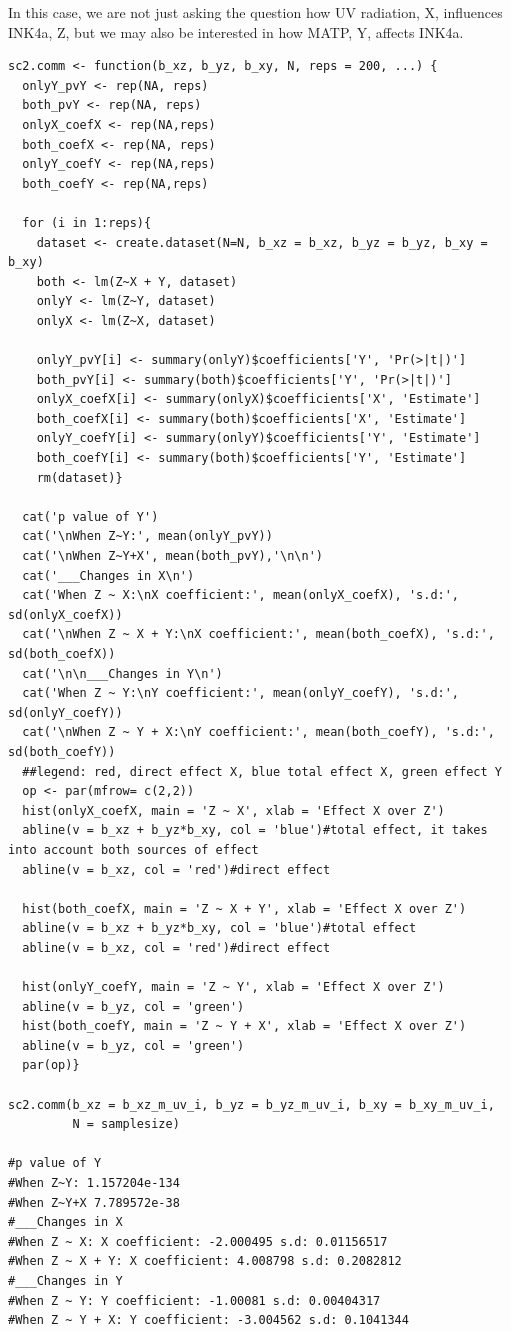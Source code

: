 \documentclass{article}
\begin{document}
In this case, we are not just asking the question how UV radiation, X, influences INK4a, Z, but we may also be interested in how MATP, Y, affects INK4a.
\begin{lstlisting}
sc2.comm <- function(b_xz, b_yz, b_xy, N, reps = 200, ...) {
  onlyY_pvY <- rep(NA, reps)
  both_pvY <- rep(NA, reps)
  onlyX_coefX <- rep(NA,reps)
  both_coefX <- rep(NA, reps)
  onlyY_coefY <- rep(NA,reps)
  both_coefY <- rep(NA,reps)
  
  for (i in 1:reps){
    dataset <- create.dataset(N=N, b_xz = b_xz, b_yz = b_yz, b_xy = b_xy)
    both <- lm(Z~X + Y, dataset)
    onlyY <- lm(Z~Y, dataset)
    onlyX <- lm(Z~X, dataset)
    
    onlyY_pvY[i] <- summary(onlyY)$coefficients['Y', 'Pr(>|t|)']
    both_pvY[i] <- summary(both)$coefficients['Y', 'Pr(>|t|)']
    onlyX_coefX[i] <- summary(onlyX)$coefficients['X', 'Estimate']
    both_coefX[i] <- summary(both)$coefficients['X', 'Estimate']
    onlyY_coefY[i] <- summary(onlyY)$coefficients['Y', 'Estimate']
    both_coefY[i] <- summary(both)$coefficients['Y', 'Estimate']
    rm(dataset)}
  
  cat('p value of Y')
  cat('\nWhen Z~Y:', mean(onlyY_pvY))
  cat('\nWhen Z~Y+X', mean(both_pvY),'\n\n')
  cat('___Changes in X\n')
  cat('When Z ~ X:\nX coefficient:', mean(onlyX_coefX), 's.d:', sd(onlyX_coefX))
  cat('\nWhen Z ~ X + Y:\nX coefficient:', mean(both_coefX), 's.d:', sd(both_coefX))
  cat('\n\n___Changes in Y\n')
  cat('When Z ~ Y:\nY coefficient:', mean(onlyY_coefY), 's.d:', sd(onlyY_coefY))
  cat('\nWhen Z ~ Y + X:\nY coefficient:', mean(both_coefY), 's.d:', sd(both_coefY))
  ##legend: red, direct effect X, blue total effect X, green effect Y
  op <- par(mfrow= c(2,2))
  hist(onlyX_coefX, main = 'Z ~ X', xlab = 'Effect X over Z')
  abline(v = b_xz + b_yz*b_xy, col = 'blue')#total effect, it takes into account both sources of effect
  abline(v = b_xz, col = 'red')#direct effect
  
  hist(both_coefX, main = 'Z ~ X + Y', xlab = 'Effect X over Z')
  abline(v = b_xz + b_yz*b_xy, col = 'blue')#total effect
  abline(v = b_xz, col = 'red')#direct effect
  
  hist(onlyY_coefY, main = 'Z ~ Y', xlab = 'Effect X over Z')
  abline(v = b_yz, col = 'green')
  hist(both_coefY, main = 'Z ~ Y + X', xlab = 'Effect X over Z')
  abline(v = b_yz, col = 'green') 
  par(op)}

sc2.comm(b_xz = b_xz_m_uv_i, b_yz = b_yz_m_uv_i, b_xy = b_xy_m_uv_i,
         N = samplesize)

#p value of Y
#When Z~Y: 1.157204e-134
#When Z~Y+X 7.789572e-38 
#___Changes in X
#When Z ~ X: X coefficient: -2.000495 s.d: 0.01156517
#When Z ~ X + Y: X coefficient: 4.008798 s.d: 0.2082812
#___Changes in Y
#When Z ~ Y: Y coefficient: -1.00081 s.d: 0.00404317
#When Z ~ Y + X: Y coefficient: -3.004562 s.d: 0.1041344
\end{lstlisting}
\end{document}
